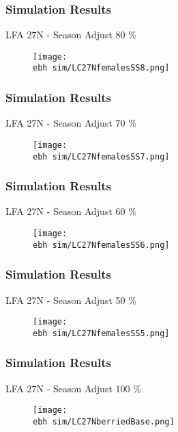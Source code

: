\documentclass{beamer}
\newcommand{\ebh}{\string~/bio.data/bio.lobster/figures/LFA2733Framework2018/} %
\begin{document}
\begin{frame}
\frametitle{Simulation Results}
LFA 27N - Season Adjust 80 \%
\begin{figure}
        \begin{center}
            \texttt{[image: \\ebh sim/LC27NfemalesSS8.png]}
        \end{center}
    \end{figure}
\end{frame}


\begin{frame}
\frametitle{Simulation Results}
LFA 27N - Season Adjust 70 \%
\begin{figure}
        \begin{center}
            \texttt{[image: \\ebh sim/LC27NfemalesSS7.png]}
        \end{center}
    \end{figure}
\end{frame}


\begin{frame}
\frametitle{Simulation Results}
LFA 27N - Season Adjust 60 \%
\begin{figure}
        \begin{center}
            \texttt{[image: \\ebh sim/LC27NfemalesSS6.png]}
        \end{center}
    \end{figure}
\end{frame}


\begin{frame}
\frametitle{Simulation Results}
LFA 27N - Season Adjust 50 \%
\begin{figure}
        \begin{center}
            \texttt{[image: \\ebh sim/LC27NfemalesSS5.png]}
        \end{center}
    \end{figure}
\end{frame}






\begin{frame}
\frametitle{Simulation Results}
LFA 27N - Season Adjust 100 \%
\begin{figure}
        \begin{center}
            \texttt{[image: \\ebh sim/LC27NberriedBase.png]}
        \end{center}
    \end{figure}
\end{frame}
\end{document}
